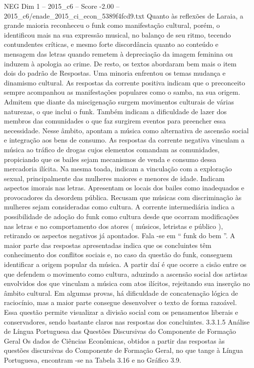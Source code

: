 \begin{textsample}{NEG Dim 1 – 2015\_c6 – Score -2.00 – 2015\_c6/enade\_2015\_ci\_econ\_5389f4fcd9.txt}
Quanto às reflexões de Laraia, a grande maioria reconheceu o funk como manifestação cultural, porém, o identificou mais na sua expressão musical, no balanço de seu ritmo, tecendo contundentes críticas, e mesmo forte discordância quanto ao conteúdo e mensagem das letras quando remetem à depreciação da imagem feminina ou induzem à apologia ao crime.
De resto, os textos abordaram bem mais o item dois do padrão de Respostas.
Uma minoria enfrentou os temas mudança e dinamismo cultural.
As respostas da corrente positiva indicam que o preconceito sempre acompanhou as manifestações populares como o samba, na sua origem.
Admitem que diante da miscigenação surgem movimentos culturais de várias naturezas, o que inclui o funk.
Também indicam a dificuldade de lazer dos membros das comunidades o que faz surgirem eventos para preencher essa necessidade.
Nesse âmbito, apontam a música como alternativa de ascensão social e integração aos bens de consumo.
As respostas da corrente negativa vinculam a música ao tráfico de drogas cujos elementos comandam as comunidades, propiciando que os bailes sejam mecanismos de venda e consumo dessa mercadoria ilícita.
Na mesma toada, indicam a vinculação com a exploração sexual, principalmente das mulheres maiores e menores de idade.
Indicam aspectos imorais nas letras.
Apresentam os locais dos bailes como inadequados e provocadores da desordem pública.
Recusam que músicas com discriminação às mulheres sejam consideradas como cultura.
A corrente intermediária indica a possibilidade de adoção do funk como cultura desde que ocorram modificações nas letras e no comportamento dos atores ( músicos, letristas e público ), retirando os aspectos negativos já apontados.
Fala -se em “ funk do bem ”.
A maior parte das respostas apresentadas indica que os concluintes têm conhecimento dos conflitos sociais e, no caso da questão do funk, conseguem identificar a origem popular da música.
A partir daí é que ocorre a cisão entre os que defendem o movimento como cultura, aduzindo a ascensão social dos artistas envolvidos dos que vinculam a música com atos ilícitos, rejeitando sua inserção no âmbito cultural.
Em algumas provas, há dificuldade de concatenação lógica de raciocínio, mas a maior parte consegue desenvolver o texto de forma razoável.
Essa questão permite visualizar a divisão social com os pensamentos liberais e conservadores, sendo bastante claros nas respostas dos concluintes. 3.3.1.5 Análise de Língua Portuguesa das Questões Discursivas do Componente de Formação Geral Os dados de Ciências Econômicas, obtidos a partir das respostas às questões discursivas do Componente de Formação Geral, no que tange à Língua Portuguesa, encontram -se na Tabela 3.16 e no Gráfico 3.9.

\end{textsample}
